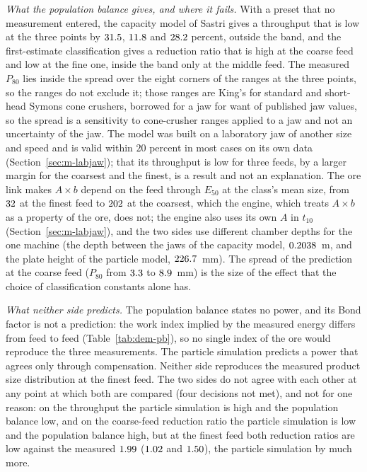 \emph{What the population balance gives, and where it fails.} With a preset that no measurement entered, the capacity model of Sastri gives a throughput that is low at the three points by $31.5$, $11.8$ and $28.2$ percent, outside the band, and the first-estimate classification gives a reduction ratio that is high at the coarse feed and low at the fine one, inside the band only at the middle feed. The measured $P_{80}$ lies inside the spread over the eight corners of the ranges at the three points, so the ranges do not exclude it; those ranges are King's for standard and short-head Symons cone crushers, borrowed for a jaw for want of published jaw values, so the spread is a sensitivity to cone-crusher ranges applied to a jaw and not an uncertainty of the jaw. The model was built on a laboratory jaw of another size and speed and is valid within $20$ percent in most cases on its own data (Section~\ref{sec:m-labjaw}); that its throughput is low for three feeds, by a larger margin for the coarsest and the finest, is a result and not an explanation. The ore link makes $A\times b$ depend on the feed through $E_{50}$ at the class's mean size, from $32$ at the finest feed to $202$ at the coarsest, which the engine, which treats $A\times b$ as a property of the ore, does not; the engine also uses its own $A$ in $t_{10}$ (Section~\ref{sec:m-labjaw}), and the two sides use different chamber depths for the one machine (the depth between the jaws of the capacity model, $0.2038$~m, and the plate height of the particle model, $226.7$~mm). The spread of the prediction at the coarse feed ($P_{80}$ from $3.3$ to $8.9$~mm) is the size of the effect that the choice of classification constants alone has.

\emph{What neither side predicts.} The population balance states no power, and its Bond factor is not a prediction: the work index implied by the measured energy differs from feed to feed (Table~\ref{tab:dem-pb}), so no single index of the ore would reproduce the three measurements. The particle simulation predicts a power that agrees only through compensation. Neither side reproduces the measured product size distribution at the finest feed. The two sides do not agree with each other at any point at which both are compared (four decisions not met), and not for one reason: on the throughput the particle simulation is high and the population balance low, and on the coarse-feed reduction ratio the particle simulation is low and the population balance high, but at the finest feed both reduction ratios are low against the measured $1.99$ ($1.02$ and $1.50$), the particle simulation by much more.

